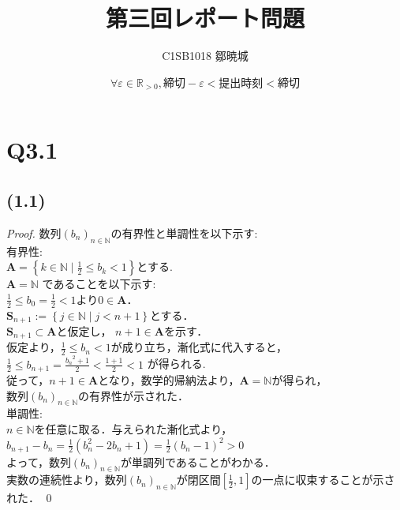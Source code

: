 \documentclass{jarticle}
\begin{document}
\title{第三回レポート問題}
\author{C1SB1018 鄒暁城}
\date{$\forall \varepsilon \in \mathbb{R}_{ > 0}, 締切-\varepsilon <提出時刻<締切$}
\maketitle
\section*{Q3.1}
\subsection*{(1.1)}
\begin{proof}
\noindent 数列$(b_{n})_{n\in \mathbb{N}}$の有界性と単調性を以下示す:
\\
\noindent 有界性: \\
\noindent $ \mathbf{A} = \left\{k \in \mathbb{N} \mid \frac{1}{2} \le b_{k} <1 \right\}$とする.\\
$ \mathbf{A} = \mathbb{N}$ であることを以下示す: \\
$ \frac{1}{2} \le b_{0}= \frac{1}{2} < 1 $より$0 \in \mathbf{A}$．\\
$ \mathbf{S}_{n+1} := \left\{j \in \mathbb{N} \mid j < n+1 \right\}$とする． \\
$ \mathbf{S}_{n+1} \subset \mathbf{A} $と仮定し， $n+1 \in \mathbf{A} $を示す．\\
仮定より，$ \frac{1}{2} \le b_{n} < 1 $が成り立ち，漸化式に代入すると，\\
$\frac{1}{2} \le b_{n+1}= \frac{{b_{n}}^2+1}{2}< \frac{1+1}{2} < 1$ が得られる.\\
従って，$n+1 \in \mathbf{A} $となり，数学的帰納法より，$ \mathbf{A} = \mathbb{N}$が得られ，\\
数列$(b_{n})_{n\in \mathbb{N}}$の有界性が示された．\\

\noindent 単調性:\\
$n \in \mathbb{N}$を任意に取る．与えられた漸化式より，\\
$ b_{n+1}-b_{n} = \frac{1}{2} (b_{n}^{2} - 2b_{n} +1) =\frac{1}{2} (b_{n} -1)^{2} >0 $\\
よって，数列$(b_{n})_{n\in \mathbb{N}}$が単調列であることがわかる．\\

\noindent 実数の連続性より，数列$(b_{n})_{n\in \mathbb{N}}$が閉区間$[ \frac{1}{2} , 1]$の一点に収束することが示された．
\qed
\end{proof}
\end{document}
